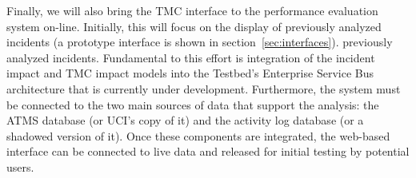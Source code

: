 Finally, we will also bring the TMC interface to the performance
evaluation system on-line.  Initially, this will focus on the display
of 
%
\iffull
previously analyzed incidents (a prototype interface is shown in section~\ref{sec:interfaces}).  
\else
previously analyzed incidents.
\fi
%
Fundamental to this effort is
integration of the incident impact and TMC impact models into the
Testbed's Enterprise Service Bus architecture that is currently under
development.  Furthermore, the system must be connected to the two
main sources of data that support the analysis: the ATMS database (or
UCI's copy of it) and the activity log database (or a shadowed version
of it).  Once these components are integrated, the web-based interface
can be connected to live data and released for initial testing by
potential users.



